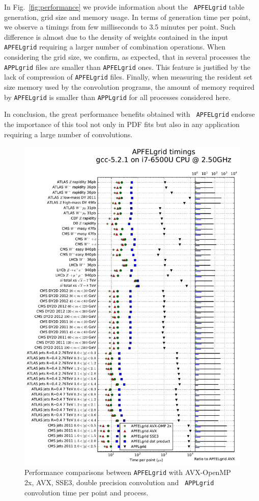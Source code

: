 \documentclass[preprint,12pt]{elsarticle}
\begin{document}
In Fig.~\ref{fig:performance} we provide information about the {\tt
  APFELgrid} table generation, grid size and memory usage. In terms of
generation time per point, we observe a timings from few milliseconds
to 3.5 minutes per point. Such difference is almost due to the density
of weights contained in the input {\tt APFELgrid} requiring a larger
number of combination operations. When considering the grid size, we
confirm, as expected, that in several processes the {\tt APPLgrid}
files are smaller than {\tt APFELgrid} ones. This feature is justified
by the lack of compression of {\tt APFELgrid} files. Finally, when
measuring the resident set size memory used by the convolution
programs, the amount of memory required by {\tt APFELgrid} is smaller
than {\tt APPLgrid} for all processes considered here.

In conclusion, the great performance benefits obtained with {\tt
  APFELgrid} endorse the importance of this tool not only in PDF fits
but also in any application requiring a large number of convolutions.

\begin{figure}
  \centering
  \includegraphics[scale=0.6]{plots/t0a}
\caption{\small Performance comparisons between {\tt APFELgrid} with
  AVX-OpenMP 2x, AVX, SSE3, double precision convolution and {\tt
    APPLgrid} convolution time per point and process.}
\label{fig:timings}
\end{figure}
\end{document}
